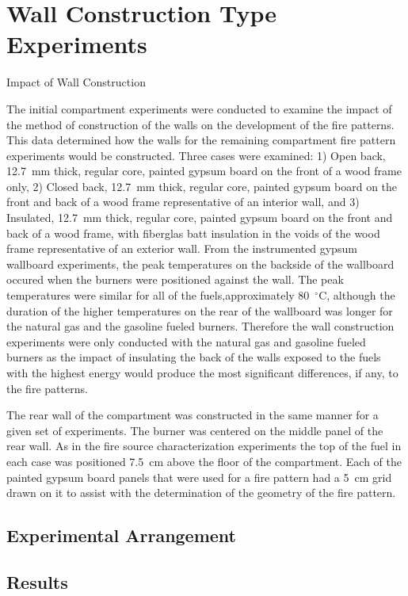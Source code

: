 \documentclass[twoside]{uocthesis}
\begin{document}
{{\section{Wall Construction Type Experiments}

 Impact of Wall Construction

 The initial compartment experiments were conducted to examine the impact of the method of construction of the walls on the development of the fire patterns. This data determined how the walls for the remaining compartment fire pattern experiments would be constructed.  Three cases were examined: 1) Open back, 12.7~mm thick, regular core, painted gypsum board on the front of a wood frame only, 2) Closed back, 12.7~mm thick, regular core, painted gypsum board on the front and back of a wood frame representative of an interior wall, and 3)	Insulated, 12.7~mm thick, regular core, painted gypsum board on the front and back of a wood frame, with fiberglas batt insulation in the voids of the wood frame representative of an exterior wall. From the instrumented gypsum wallboard experiments, the peak temperatures on the backside of the wallboard occured when the burners were positioned against the wall.  The peak temperatures were similar for all of the fuels,approximately 80~$^\circ$C, although the duration of the higher temperatures on the rear of the wallboard was longer for the natural gas and the gasoline fueled burners. Therefore the wall construction experiments were only conducted with the natural gas and gasoline fueled burners as the impact of insulating the back of the walls exposed to the fuels with the highest energy would produce the most significant differences, if any, to the fire patterns.

The rear wall of the compartment was constructed in the same manner for a given set of experiments. The burner was centered on the middle panel of the rear wall.  As in the fire source characterization experiments the top of the fuel in each case was positioned 7.5~cm above the floor of the compartment.  Each of the painted gypsum board panels that were used for a fire pattern had a 5~cm grid drawn on it to assist with the determination of the geometry of the fire pattern.

\subsection{Experimental Arrangement}



\subsection{Results}

}}
\end{document}
